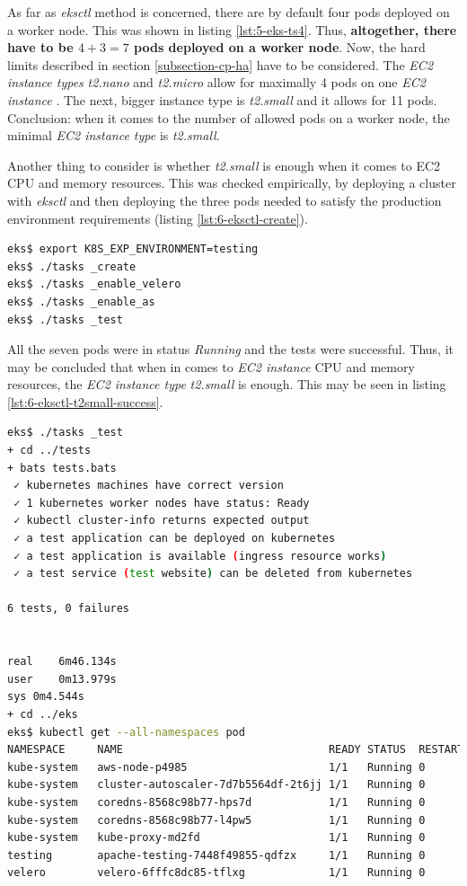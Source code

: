 As far as \textit{eksctl} method is concerned, there are by default four pods deployed on a worker node. This was shown in listing \ref{lst:5-eks-ts4}. Thus, \textbf{altogether, there have to be $4+3=7$ pods deployed on a worker node}. Now, the hard limits described in section \ref{subsection-cp-ha} have to be considered. The \textit{EC2 instance types} \textit{t2.nano} and \textit{t2.micro} allow for maximally 4 pods on one \textit{EC2 instance} \cite{eks-hard-limits}. The next, bigger instance type is \textit{t2.small} and it allows for 11 pods. Conclusion: when it comes to the number of allowed pods on a worker node, the minimal \textit{EC2 instance type} is \textit{t2.small}.

Another thing to consider is whether \textit{t2.small} is enough when it comes to EC2 CPU and memory resources. This was checked empirically, by deploying a cluster with \textit{eksctl} and then deploying the three pods needed to satisfy the production environment requirements (listing \ref{lst:6-eksctl-create}).
\begin{lstlisting}[basicstyle=\scriptsize,xleftmargin=0cm,label=lst:6-eksctl-create,caption={Deploying a production ready \textit{eksctl} cluster},captionpos=b,language=Bash]
eks$ export K8S_EXP_ENVIRONMENT=testing
eks$ ./tasks _create
eks$ ./tasks _enable_velero
eks$ ./tasks _enable_as
eks$ ./tasks _test
\end{lstlisting}

All the seven pods were in status \textit{Running} and the tests were successful. Thus, it may be concluded that when in comes to \textit{EC2 instance} CPU and memory resources, the \textit{EC2 instance type} \textit{t2.small} is enough. This may be seen in listing \ref{lst:6-eksctl-t2small-success}.
\begin{lstlisting}[basicstyle=\scriptsize,xleftmargin=0cm,label=lst:6-eksctl-t2small-success,caption={Verifying a production ready \textit{eksctl} cluster},captionpos=b,language=Bash]
eks$ ./tasks _test
+ cd ../tests
+ bats tests.bats
 ✓ kubernetes machines have correct version
 ✓ 1 kubernetes worker nodes have status: Ready
 ✓ kubectl cluster-info returns expected output
 ✓ a test application can be deployed on kubernetes
 ✓ a test application is available (ingress resource works)
 ✓ a test service (test website) can be deleted from kubernetes

6 tests, 0 failures


real	6m46.134s
user	0m13.979s
sys	0m4.544s
+ cd ../eks
eks$ kubectl get --all-namespaces pod
NAMESPACE     NAME                                READY STATUS  RESTARTS AGE
kube-system   aws-node-p4985                      1/1   Running 0        11m
kube-system   cluster-autoscaler-7d7b5564df-2t6jj 1/1   Running 0        3m2s
kube-system   coredns-8568c98b77-hps7d            1/1   Running 0        27m
kube-system   coredns-8568c98b77-l4pw5            1/1   Running 0        27m
kube-system   kube-proxy-md2fd                    1/1   Running 0        11m
testing       apache-testing-7448f49855-qdfzx     1/1   Running 0        111s
velero        velero-6fffc8dc85-tflxg             1/1   Running 0        3m54s
\end{lstlisting}

